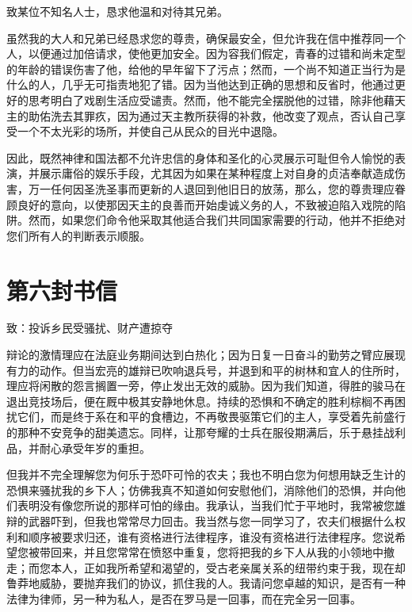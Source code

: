 致某位不知名人士，恳求他温和对待其兄弟。\par

虽然我的大人和兄弟已经恳求您的尊贵，确保最安全，但允许我在信中推荐同一个人，以便通过加倍请求，使他更加安全。因为容我们假定，青春的过错和尚未定型的年龄的错误伤害了他，给他的早年留下了污点；然而，一个尚不知道正当行为是什么的人，几乎无可指责地犯了错。因为当他达到正确的思想和反省时，他通过更好的思考明白了戏剧生活应受谴责。然而，他不能完全摆脱他的过错，除非他藉天主的助佑洗去其罪疚，因为通过天主教所获得的补救，他改变了观点，否认自己享受一个不太光彩的场所，并使自己从民众的目光中退隐。\par

\par

因此，既然神律和国法都不允许忠信的身体和圣化的心灵展示可耻但令人愉悦的表演，并展示庸俗的娱乐手段，尤其因为如果在某种程度上对自身的贞洁奉献造成伤害，万一任何因圣洗圣事而更新的人退回到他旧日的放荡，那么，您的尊贵理应眷顾良好的意向，以使那因天主的良善而开始虔诚义务的人，不致被迫陷入戏院的陷阱。然而，如果您们命令他采取其他适合我们共同国家需要的行动，他并不拒绝对您们所有人的判断表示顺服。\par


\section{第六封书信}

致：投诉乡民受骚扰、财产遭掠夺\par

辩论的激情理应在法庭业务期间达到白热化；因为日复一日奋斗的勤劳之臂应展现有力的动作。但当宏亮的雄辩已吹响退兵号，并退到和平的树林和宜人的住所时，理应将闲散的怨言搁置一旁，停止发出无效的威胁。因为我们知道，得胜的骏马在退出竞技场后，便在厩中极其安静地休息。持续的恐惧和不确定的胜利棕榈不再困扰它们，而是终于系在和平的食槽边，不再敬畏驱策它们的主人，享受着先前盛行的那种不安竞争的甜美遗忘。同样，让那夸耀的士兵在服役期满后，乐于悬挂战利品，并耐心承受年岁的重担。\par

但我并不完全理解您为何乐于恐吓可怜的农夫；我也不明白您为何想用缺乏生计的恐惧来骚扰我的乡下人；仿佛我真不知道如何安慰他们，消除他们的恐惧，并向他们表明没有像您所说的那样可怕的缘由。我承认，当我们忙于平地时，我常被您雄辩的武器吓到，但我也常常尽力回击。我当然与您一同学习了，农夫们根据什么权利和顺序被要求归还，谁有资格进行法律程序，谁没有资格进行法律程序。您说希望您被带回来，并且您常常在愤怒中重复，您将把我的乡下人从我的小领地中撤走；而您本人，正如我所希望和渴望的，受古老亲属关系的纽带约束于我，现在却鲁莽地威胁，要抛弃我们的协议，抓住我的人。我请问您卓越的知识，是否有一种法律为律师，另一种为私人，是否在罗马是一回事，而在完全另一回事。\par

